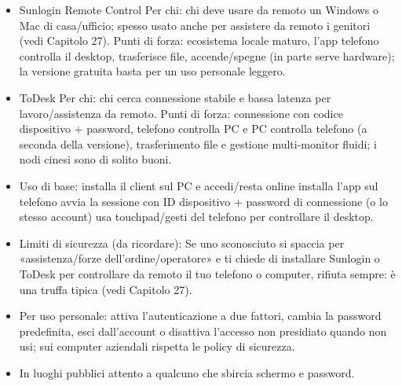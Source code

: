 \begin{itemize}
  \item Sunlogin Remote Control Per chi: chi deve usare da remoto un Windows o Mac di casa/ufficio; spesso usato anche per assistere da remoto i genitori (vedi Capitolo 27). Punti di forza: ecosistema locale maturo, l'app telefono controlla il desktop, trasferisce file, accende/spegne (in parte serve hardware); la versione gratuita basta per un uso personale leggero.
  \item ToDesk Per chi: chi cerca connessione stabile e bassa latenza per lavoro/assistenza da remoto. Punti di forza: connessione con codice dispositivo + password, telefono controlla PC e PC controlla telefono (a seconda della versione), trasferimento file e gestione multi-monitor fluidi; i nodi cinesi sono di solito buoni.
  \item Uso di base: installa il client sul PC e accedi/resta online installa l'app sul telefono avvia la sessione con ID dispositivo + password di connessione (o lo stesso account) usa touchpad/gesti del telefono per controllare il desktop.
  \item Limiti di sicurezza (da ricordare): Se uno sconosciuto si spaccia per «assistenza/forze dell'ordine/operatore» e ti chiede di installare Sunlogin o ToDesk per controllare da remoto il tuo telefono o computer, rifiuta sempre: è una truffa tipica (vedi Capitolo 27).
  \item Per uso personale: attiva l'autenticazione a due fattori, cambia la password predefinita, esci dall'account o disattiva l'accesso non presidiato quando non usi; sui computer aziendali rispetta le policy di sicurezza.
  \item In luoghi pubblici attento a qualcuno che sbircia schermo e password.
\end{itemize}


